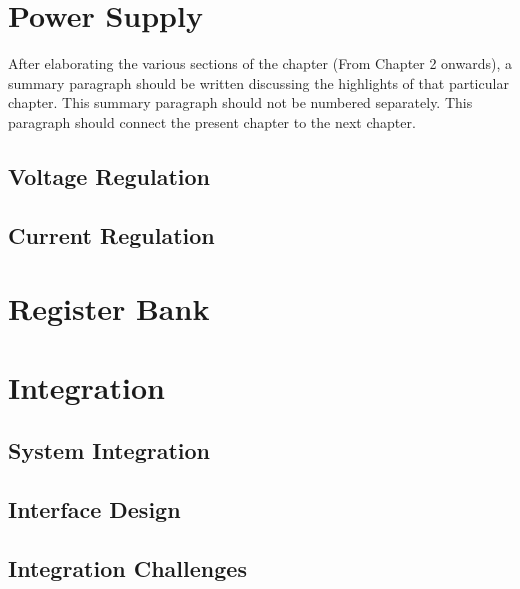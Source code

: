 \section{Power Supply}
After elaborating the various sections of the chapter (From Chapter 2 onwards), a summary paragraph should be written discussing the highlights of that particular chapter. This summary paragraph should not be numbered separately. This paragraph should connect the present chapter to the next chapter. 
\subsection{Voltage Regulation}
\subsection{Current Regulation}
\section{Register Bank}
\section{Integration}
\subsection{System Integration}
\subsection{Interface Design}
\subsection{Integration Challenges}
